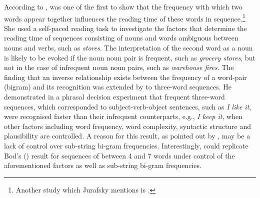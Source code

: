 According to \citet[51]{jurafsky2003}, \citet{macdonald} was one of the first to show that the frequency with which two words appear together influences the reading time of these words in sequence.\footnote{Another study which Jurafsky mentions is \citet{trueswell-etal}.} She used a self-paced reading task to investigate the factors that determine the reading time of sequences consisting of nouns and words ambiguous between nouns and verbs, such as \textit{stores}. The interpretation of the second word as a noun is likely to be evoked if the noun noun pair is frequent, such as \textit{grocery stores}, but not in the case of infrequent noun noun pairs, such as \textit{warehouse fires}. The finding that an inverse relationship exists between the frequency of a word-pair (bigram) and its recognition was extended by \citet{bod2000} to three-word sequences. He demonstrated in a phrasal decision experiment that frequent three-word sequences, which corresponded to subject-verb-object sentences, such as \textit{I like it}, were recognised faster than their infrequent counterparts, e.g., \textit{I keep it}, when other factors including word frequency, word complexity, syntactic structure and plausibility are controlled. A reason for this result, as pointed out by \citet[62]{jurafsky2003}, may be a lack of control over sub-string bi-gram frequencies. Interestingly, \citet{bannard-ramscar} could replicate Bod's (\citeyear{bod2000}) result for sequences of between 4 and 7 words under control of the aforementioned factors as well as sub-string bi-gram frequencies. 

